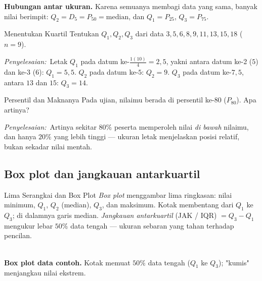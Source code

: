 \documentclass[11pt,a4paper]{report}
\theoremstyle{gaya}
\newcommand{\jawab}{\par\smallskip\noindent\textit{\textcolor{oranye}{Penyelesaian:}}\ }
\begin{document}
\textbf{Hubungan antar ukuran.} Karena semuanya membagi data yang sama, banyak nilai berimpit: $Q_2=D_5=P_{50}=\text{median}$, dan $Q_1=P_{25}$, $Q_3=P_{75}$.

\begin{contoh}{Menentukan Kuartil}
Tentukan $Q_1,Q_2,Q_3$ dari data $3,5,6,8,9,11,13,15,18$ ($n=9$).

\jawab Letak $Q_1$ pada datum ke-$\tfrac{1(10)}{4}=2{,}5$, yakni antara datum ke-2 ($5$) dan ke-3 ($6$): $Q_1=5{,}5$. $Q_2$ pada datum ke-$5$: $Q_2=9$. $Q_3$ pada datum ke-$7{,}5$, antara $13$ dan $15$: $Q_3=14$.
\end{contoh}

\begin{contoh}{Persentil dan Maknanya}
Pada ujian, nilaimu berada di persentil ke-$80$ ($P_{80}$). Apa artinya?

\jawab Artinya sekitar $80\%$ peserta memperoleh nilai \emph{di bawah} nilaimu, dan hanya $20\%$ yang lebih tinggi --- ukuran letak menjelaskan posisi relatif, bukan sekadar nilai mentah.
\end{contoh}

\subsection*{Box plot dan jangkauan antarkuartil}
\begin{konsep}{Lima Serangkai dan Box Plot}
\emph{Box plot} menggambar lima ringkasan: nilai minimum, $Q_1$, $Q_2$ (median), $Q_3$, dan maksimum. Kotak membentang dari $Q_1$ ke $Q_3$; di dalamnya garis median. \emph{Jangkauan antarkuartil} (JAK / IQR) $=Q_3-Q_1$ mengukur lebar $50\%$ data tengah --- ukuran sebaran yang tahan terhadap pencilan.
\end{konsep}

\begin{center}
\\
\small \textbf{Box plot data contoh.} Kotak memuat $50\%$ data tengah ($Q_1$ ke $Q_3$); "kumis" menjangkau nilai ekstrem.
\end{center}
\end{document}
